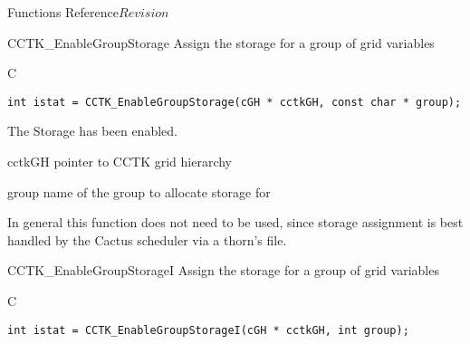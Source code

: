 \begin{cactuspart}{ Functions Reference}{}{$Revision$}
\begin{FunctionDescription}{CCTK\_EnableGroupStorage}
\label{CCTK-EnableGroupStorage}
Assign the storage for a group of grid variables
\begin{SynopsisSection}
\begin{Synopsis}{C}
\begin{verbatim}
int istat = CCTK_EnableGroupStorage(cGH * cctkGH, const char * group);
\end{verbatim}
\end{Synopsis}
\end{SynopsisSection}

\begin{ResultSection}
\begin{Result}{0}
The Storage has been enabled.
\end{Result}
\end{ResultSection}

\begin{ParameterSection}
\begin{Parameter}{cctkGH}
pointer to CCTK grid hierarchy
\end{Parameter}
\begin{Parameter}{group}
name of the group to allocate storage for
\end{Parameter}
\end{ParameterSection}

\begin{Discussion}
In general this function does not need to be used, since storage assignment is best handled by
the Cactus scheduler via a thorn's  file.
\end{Discussion}

\end{FunctionDescription}

\begin{FunctionDescription}{CCTK\_EnableGroupStorageI}
\label{CCTK-EnableGroupStorageI}
Assign the storage for a group of grid variables
\begin{SynopsisSection}
\begin{Synopsis}{C}
\begin{verbatim}
int istat = CCTK_EnableGroupStorageI(cGH * cctkGH, int group);
\end{verbatim}
\end{Synopsis}
\end{SynopsisSection}


\end{FunctionDescription}
\end{cactuspart}
